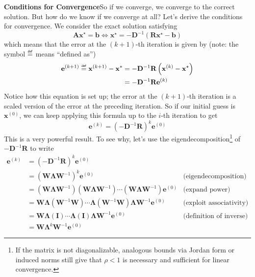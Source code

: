 \textbf{Conditions for Convergence}\quad So if we converge, we converge to the correct solution. But how do we know if we converge at all? Let's derive the conditions for convergence. We consider the exact solution satisfying
\begin{equation*}
    \mathbf{A x}^\star = \mathbf{b} \iff \mathbf{x}^\star = -\mathbf{D}^{-1}\left(\mathbf{R}\mathbf{x}^\star - \mathbf{b}\right)
\end{equation*}
which means that the error at the $(k+1)$-th iteration is given by (note: the symbol $\mydef$ means ``defined as'')
\begin{align*}
    \mathbf{e}^{(k+1)} \mydef \mathbf{x}^{(k+1)} - \mathbf{x}^* &= -\mathbf{D}^{-1}\mathbf{R}\left(\mathbf{x}^{(k)} - \mathbf{x}^\star\right) \\
    &= -\mathbf{D}^{-1}\mathbf{R}\mathbf{e}^{(k)}
\end{align*}
Notice how this equation is set up; the error at the $(k+1)$-th iteration is a scaled version of the error at the preceding iteration. So if our initial guess is $\mathbf{x}^{(0)}$, we can keep applying this formula up to the $i$-th iteration to get
\begin{equation*}
    \mathbf{e}^{(k)} = \left( -\mathbf{D}^{-1}\mathbf{R} \right)^k \mathbf{e}^{(0)}
\end{equation*}
This is a very powerful result. To see why, let's use the eigendecomposition\footnote{If the matrix is not diagonalizable, analogous bounds via Jordan form or induced norms still give that $\rho<1$ is necessary and sufficient for linear convergence.} of $-\mathbf{D}^{-1}\mathbf{R}$ to write
\begin{align*}
    \mathbf{e}^{(k)} &=  \left( -\mathbf{D}^{-1}\mathbf{R} \right)^k \mathbf{e}^{(0)} & \\
    &= \left(\mathbf{W} \boldsymbol{\Lambda} \mathbf{W}^{-1}\right)^k \mathbf{e}^{(0)} &\text{(eigendecomposition)} \\
    &= \left(\mathbf{W} \boldsymbol{\Lambda} \mathbf{W}^{-1}\right)\left(\mathbf{W} \boldsymbol{\Lambda} \mathbf{W}^{-1}\right)\cdots\left(\mathbf{W} \boldsymbol{\Lambda} \mathbf{W}^{-1}\right) \mathbf{e}^{(0)} &\text{(expand power)}\\
    &= \mathbf{W} \boldsymbol{\Lambda} \left(\mathbf{W}^{-1}\mathbf{W}\right)\cdots \boldsymbol{\Lambda} \left(\mathbf{W}^{-1}\mathbf{W}\right) \boldsymbol{\Lambda} \mathbf{W}^{-1}\mathbf{e}^{(0)} &\text{(exploit associativity)} \\
    &= \mathbf{W} \boldsymbol{\Lambda} \left(\mathbf{I}\right)\cdots \boldsymbol{\Lambda} \left(\mathbf{I}\right) \boldsymbol{\Lambda} \mathbf{W}^{-1} \mathbf{e}^{(0)} &\text{(definition of inverse)} \\
    &= \mathbf{W} \boldsymbol{\Lambda}^k \mathbf{W}^{-1} \mathbf{e}^{(0)} &
\end{align*}
